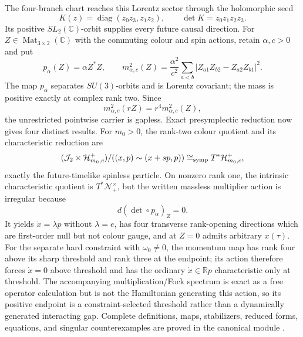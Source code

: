 \documentclass[10pt,letterpaper]{article}
\begin{document}
The four-branch chart reaches this Lorentz sector through the holomorphic
seed
\[
 K(z)=\operatorname{diag}(z_0z_3,z_1z_2),\qquad
 \det K=z_0z_1z_2z_3.
\]
Its positive \(SL_2(\mathbb C)\)-orbit supplies every future causal
direction.  For \(Z\in\operatorname{Mat}_{3\times2}(\mathbb C)\) with the
commuting colour and spin actions, retain \(\alpha,c>0\) and put
\[
 p_\alpha(Z)=\alpha Z^*Z,\qquad
 m_{\alpha,c}^2(Z)=\frac{\alpha^2}{c^2}
 \sum_{a<b}|Z_{a1}Z_{b2}-Z_{a2}Z_{b1}|^2.
\]
The map \(p_\alpha\) separates \(SU(3)\)-orbits and is Lorentz covariant;
the mass is positive exactly at complex rank two.  Since
\[
 m_{\alpha,c}^2(rZ)=r^4m_{\alpha,c}^2(Z),
\]
 the unrestricted pointwise carrier is gapless.  Exact presymplectic reduction
now gives four distinct results.  For \(m_0>0\), the rank-two colour quotient
and its characteristic reduction are
\[
 (\mathcal J_2\times\mathcal H^+_{m_0,c})/
 ((x,p)\sim(x+sp,p))\cong_{\rm symp}T^*\mathcal H^+_{m_0,c},
\]
exactly the future-timelike spinless particle.  On nonzero rank one, the
intrinsic characteristic quotient is \(T^*\mathcal N_+^\times\), but the
written massless multiplier action is irregular because
\[
 d(\det\circ p_\alpha)_Z=0.
\]
It yields \(\dot x=\lambda p\) without \(\lambda=e\), has four transverse
rank-opening directions which are first-order null but not colour gauge, and
at \(Z=0\) admits arbitrary \(x(\tau)\).  For the separate hard constraint
with \(\omega_0\ne0\), the momentum map has rank four above its sharp
threshold and rank three at the endpoint; its action therefore forces
\(\dot x=0\) above threshold and has the ordinary
\(\dot x\in\mathbb Rp\) characteristic only at threshold.  The accompanying
multiplication/Fock spectrum is exact as a free operator calculation but is
not the Hamiltonian generating this action, so its positive endpoint is a
constraint-selected threshold rather than a dynamically generated
interacting gap.  Complete definitions, maps, stabilizers, reduced forms,
equations, and singular counterexamples are proved in the canonical module
.
\end{document}
